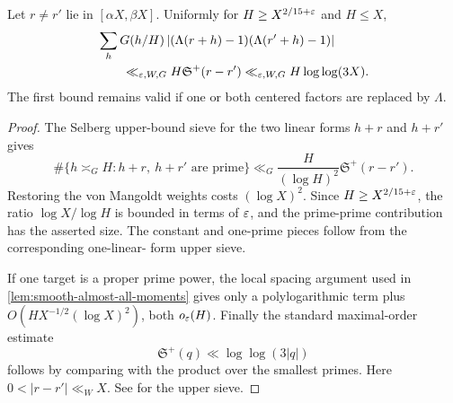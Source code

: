 \begin{lemma}
\label{lem:short-two-target-sieve}
Let $r\ne r'$ lie in $[\alpha X,\beta X]$.  Uniformly for
$H\geq X^{2/15+\varepsilon}$ and $H\leq X$,
\begin{equation}
 \begin{aligned}
 &\sum_hG(h/H)
 \left|(\Lambda(r+h)-1)(\Lambda(r'+h)-1)\right|\\
 &\qquad\ll_{\varepsilon,W,G}H\mathfrak S^+(r-r')
 \ll_{\varepsilon,W,G}H\log\log(3X).
 \end{aligned}
 \label{eq:short-two-target-sieve}
\end{equation}
The first bound remains valid if one or both centered factors are
replaced by $\Lambda$.
\end{lemma}

\begin{proof}
The Selberg upper-bound sieve for the two linear forms $h+r$ and $h+r'$
gives
\[
 \#\{h\asymp_GH:h+r,\ h+r'\text{ are prime}\}
 \ll_G\frac{H}{(\log H)^2}\mathfrak S^+(r-r').
\]
Restoring the von Mangoldt weights costs $(\log X)^2$.  Since
$H\geq X^{2/15+\varepsilon}$, the ratio $\log X/\log H$ is bounded in terms of
$\varepsilon$, and the prime-prime contribution has the asserted size.  The
constant and one-prime pieces follow from the corresponding one-linear-
form upper sieve.

If one target is a proper prime power, the local spacing argument used in
\cref{lem:smooth-almost-all-moments} gives only a polylogarithmic term
plus $O(HX^{-1/2}(\log X)^2)$, both $o_\varepsilon(H)$.  Finally the standard
maximal-order estimate
\[
 \mathfrak S^+(q)\ll\log\log(3|q|)
\]
follows by comparing with the product over the smallest primes.  Here
$0<|r-r'|\ll_WX$.  See \citet[Chapter~6]{HalberstamRichert1974} for the
upper sieve.
\end{proof}
